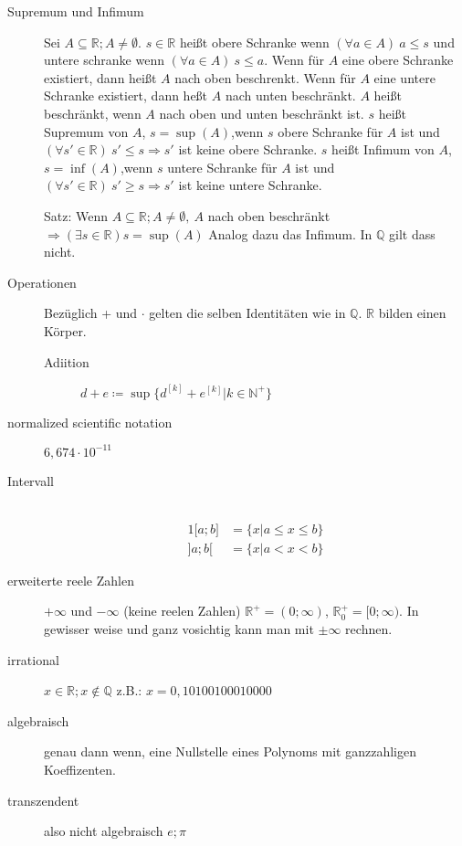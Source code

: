 \documentclass[12pt,a4paper]{article}
\DeclareMathOperator\supri{sup}
\DeclareMathOperator\infim{inf}
\begin{document}
\begin{description}
	\item[Supremum und Infimum] Sei $A \subseteq \mathbb{R}; A \not = \emptyset$. $s \in \mathbb{R}$ heißt obere Schranke wenn $(\forall a \in A)\ a \leq s$ und untere schranke wenn $(\forall a \in A)\ s \leq a$. Wenn für $A$ eine obere Schranke existiert, dann heißt $A$ nach oben beschrenkt. Wenn für $A$ eine untere Schranke existiert, dann heßt $A$ nach unten beschränkt. $A$ heißt beschränkt, wenn $A$ nach oben und unten beschränkt ist. $s$ heißt Supremum von $A$, $s = \sup(A)$,wenn $s$ obere Schranke für $A$ ist und $(\forall s' \in \mathbb{R})\ s' \leq s \Rightarrow s'$ ist keine obere Schranke. $s$ heißt Infimum von $A$, $s = \infim(A)$,wenn $s$ untere Schranke für $A$ ist und $(\forall s' \in \mathbb{R})\ s' \geq s \Rightarrow s'$ ist keine untere Schranke.

		Satz: Wenn $A \subseteq \mathbb{R}; A \not = \emptyset,\ A$ nach oben beschränkt $\Rightarrow (\exists s \in \mathbb{R}) s = \supri(A)$ Analog dazu das Infimum. In $\mathbb{Q}$ gilt dass nicht.

	\item[Operationen] Bezüglich + und $\cdot$ gelten die selben Identitäten wie in $\mathbb{Q}$. $\mathbb{R}$ bilden einen Körper.
		\begin{description}
			\item[Adiition] $d + e \coloneqq \supri \lbrace d^{[k]} + e^[k] | k \in \mathbb{N}^+ \rbrace$
			\item[]
		\end{description}
	\item[normalized scientific notation] $6,674 \cdot 10^{-11}$
	\item[Intervall] \
		\begin{alignat*}{1}
			\lbrack a; b \rbrack & = \lbrace x | a \leq x\leq b \rbrace \\
			\rbrack a; b \lbrack & = \lbrace x | a < x < b \rbrace
		\end{alignat*}
	\item[erweiterte reele Zahlen] $+\infty$ und $-\infty$ (keine reelen Zahlen) $\mathbb{R}^+ = (0; \infty)$, $\mathbb{R}_0^+=\lbrack 0 ; \infty)$. In gewisser weise und ganz vosichtig kann man mit $\pm \infty$ rechnen.
	\item[irrational] $x \in \mathbb{R}; x \not \in \mathbb{Q}$ z.B.: $x = 0,10100100010000$
	\item[algebraisch] genau dann wenn, eine Nullstelle eines Polynoms mit ganzzahligen Koeffizenten.
	\item[transzendent] also nicht algebraisch $e; \pi$
\end{description}
\end{document}
